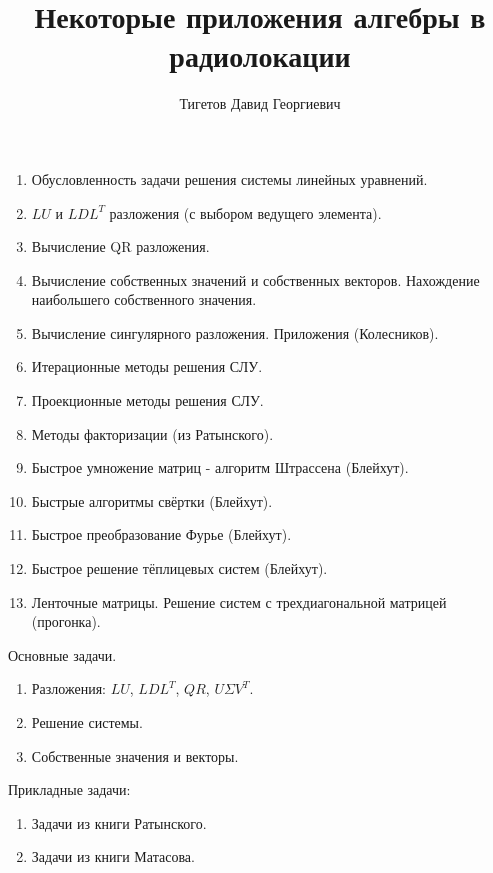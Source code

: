 \documentclass[a4paper,12pt]{book}
\begin{document}
    \title{Некоторые приложения алгебры в радиолокации}
    \author{Тигетов Давид Георгиевич}
    \maketitle

    \tableofcontents

    

    

    
    

    

    
    
    
    
    
    

    

    \begin{enumerate}
        \item Обусловленность задачи решения системы линейных уравнений.
        \item $LU$ и $LDL^T$ разложения (с выбором ведущего элемента).
        \item Вычисление QR разложения.
        \item Вычисление собственных значений и собственных векторов. Нахождение наибольшего собственного значения.
        \item Вычисление сингулярного разложения. Приложения (Колесников).
        \item Итерационные методы решения СЛУ.
        \item Проекционные методы решения СЛУ.
        \item Методы факторизации (из Ратынского).
        \item Быстрое умножение матриц - алгоритм Штрассена (Блейхут).
        \item Быстрые алгоритмы свёртки (Блейхут).
        \item Быстрое преобразование Фурье (Блейхут).
        \item Быстрое решение тёплицевых систем (Блейхут).
        \item Ленточные матрицы. Решение систем с трехдиагональной матрицей (прогонка).
    \end{enumerate}

    Основные задачи.
    \begin{enumerate}
        \item Разложения: $LU$, $LDL^T$, $QR$, $U \Sigma V^T$.
        \item Решение системы.
        \item Собственные значения и векторы.
    \end{enumerate}

    Прикладные задачи:
    \begin{enumerate}
        \item Задачи из книги Ратынского.
        \item Задачи из книги Матасова.
    \end{enumerate}
\end{document}
